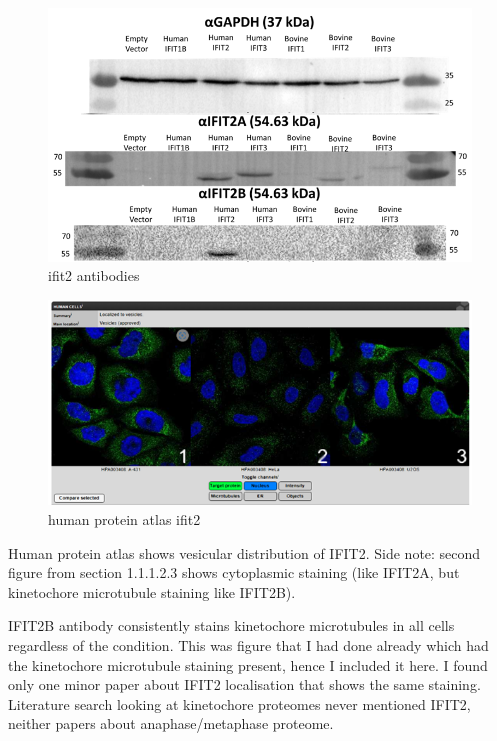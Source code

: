 \begin{figure}
    \centering
    \includegraphics[width=1\linewidth]{09. Chapter 4/Figs/05. IFIT2AB Discussion/01. antibodies ifit2.png}
    \caption[ifit2 antibodies]{ifit2 antibodies}
    \label{fig:ifit2 antibodies}
\end{figure}

\begin{figure}
    \centering
    \includegraphics[width=1\linewidth]{09. Chapter 4/Figs/05. IFIT2AB Discussion/02. human protein atlas ifit2.png}
    \caption[human protein atlas ifit2]{human protein atlas ifit2}
    \label{fig:human protein atlas ifit2}
\end{figure}

Human protein atlas shows vesicular distribution of IFIT2.
Side note: second figure from section 1.1.1.2.3 shows cytoplasmic staining (like IFIT2A, but kinetochore microtubule staining like IFIT2B).

IFIT2B antibody consistently stains kinetochore microtubules in all cells regardless of the condition. This was figure that I had done already which had the kinetochore microtubule staining present, hence I included it here. I found only one minor paper about IFIT2 localisation that shows the same staining. Literature search looking at kinetochore proteomes never mentioned IFIT2, neither papers about anaphase/metaphase proteome.

